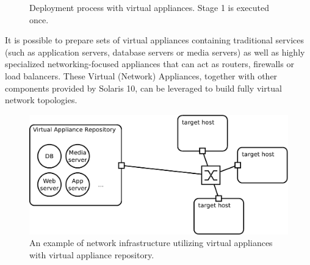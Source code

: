 \documentclass[11pt]{book}
\begin{document}
        \begin{figure}[H]
          \begin{center}
          \end{center}

          \caption{Deployment process with virtual appliances. Stage 1 is executed once.}
        \end{figure}

        It is possible to prepare sets of virtual appliances containing traditional services (such as application
        servers, database servers or media servers) as well as highly specialized networking-focused appliances that can
        act as routers, firewalls or load balancers. These Virtual (Network) Appliances, together with other components
        provided by Solaris 10,  can be leveraged to build fully virtual network topologies.

        \begin{figure}[H]
          \begin{center}
            \includegraphics[width=.7\textwidth]{img/solaris/virtual-appliance-infra.pdf}
          \end{center}

          \caption{An example of network infrastructure utilizing virtual appliances with virtual appliance repository.}
        \end{figure}
\end{document}
